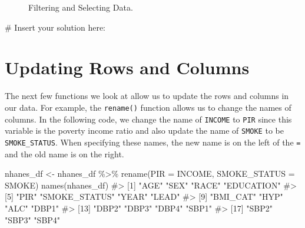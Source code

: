 \documentclass[
  letterpaper,
]{latex/krantz}
\makeatletter
\newenvironment{Shaded}{\begin{snugshade}}{\end{snugshade}}
\newcommand{\AttributeTok}[1]{\textcolor[rgb]{0.40,0.45,0.13}{#1}}
\newcommand{\CommentTok}[1]{\textcolor[rgb]{0.37,0.37,0.37}{#1}}
\newcommand{\FunctionTok}[1]{\textcolor[rgb]{0.28,0.35,0.67}{#1}}
\newcommand{\NormalTok}[1]{\textcolor[rgb]{0.00,0.23,0.31}{#1}}
\newcommand{\OtherTok}[1]{\textcolor[rgb]{0.00,0.23,0.31}{#1}}
\newcommand{\SpecialCharTok}[1]{\textcolor[rgb]{0.37,0.37,0.37}{#1}}
\newenvironment{kframe}{%
\medskip{}
\setlength{\fboxsep}{.8em}
 \def\at@end@of@kframe{}%
 \ifinner\ifhmode%
  \def\at@end@of@kframe{\end{minipage}}%
  \begin{minipage}{\columnwidth}%
 \fi\fi%
 \def\FrameCommand##1{\hskip\@totalleftmargin \hskip-\fboxsep
 \colorbox{shadecolor}{##1}\hskip-\fboxsep
     \hskip-\linewidth \hskip-\@totalleftmargin \hskip\columnwidth}%
 \MakeFramed {\advance\hsize-\width
   \@totalleftmargin\z@ \linewidth\hsize
   \@setminipage}}%
 {\par\unskip\endMakeFramed%
 \at@end@of@kframe}
\renewenvironment{Shaded}{\begin{kframe}}{\end{kframe}}
\makeatother
\begin{document}
\begin{figure}


\caption{\label{fig-filtering-and-selecting}Filtering and Selecting
Data.}

\end{figure}%

\begin{Shaded}
\begin{Highlighting}[]
\CommentTok{\# Insert your solution here:}
\end{Highlighting}
\end{Shaded}

\section{\texorpdfstring{Updating Rows and Columns
 
}{Updating Rows and Columns   }}\label{updating-rows-and-columns}

The next few functions we look at allow us to update the rows and
columns in our data. For example, the
\texttt{rename()} function
allows us to change the names of columns. In the following code, we
change the name of \texttt{INCOME} to \texttt{PIR} since this variable
is the poverty income ratio and also update the name of \texttt{SMOKE}
to be \texttt{SMOKE\_STATUS}. When specifying these names, the new name
is on the left of the \texttt{=} and the old name is on the right.

\begin{Shaded}
\begin{Highlighting}[]
\NormalTok{nhanes\_df }\OtherTok{\textless{}{-}}\NormalTok{ nhanes\_df }\SpecialCharTok{\%\textgreater{}\%} \FunctionTok{rename}\NormalTok{(}\AttributeTok{PIR =}\NormalTok{ INCOME, }\AttributeTok{SMOKE\_STATUS =}\NormalTok{ SMOKE)}
\FunctionTok{names}\NormalTok{(nhanes\_df)}
\CommentTok{\#\textgreater{}  [1] "AGE"          "SEX"          "RACE"         "EDUCATION"   }
\CommentTok{\#\textgreater{}  [5] "PIR"          "SMOKE\_STATUS" "YEAR"         "LEAD"        }
\CommentTok{\#\textgreater{}  [9] "BMI\_CAT"      "HYP"          "ALC"          "DBP1"        }
\CommentTok{\#\textgreater{} [13] "DBP2"         "DBP3"         "DBP4"         "SBP1"        }
\CommentTok{\#\textgreater{} [17] "SBP2"         "SBP3"         "SBP4"}
\end{Highlighting}
\end{Shaded}
\end{document}
